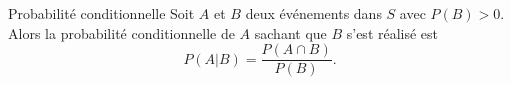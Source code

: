 \documentclass{BeamerTemplate}
\begin{document}

\begin{frame}[t]%
 \begin{Boite}{Probabilité conditionnelle}
  Soit $A$ et $B$ deux événements dans $S$ avec $P(B)>0$. Alors
  la \alert{probabilité conditionnelle} de $A$  sachant que  $B$ s'est réalisé est
  $$P(A|B)=\frac{P(A\cap B)}{P(B)}.$$
 \end{Boite}
\end{frame}
\end{document}
